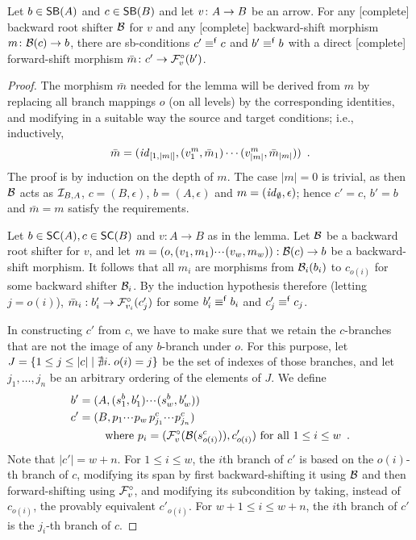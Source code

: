 \begin{lemma}
Let $b\in \SB A$ and $c\in \SB B$ and let $v\colon A\rightarrow B$ be an arrow. For any [complete] backward root shifter $\mathcal{B}$ for $v$ and any [complete] backward-shift morphism $m\colon \mathcal{B}(c)\rightarrow b$, there are sb-conditions  $c'\equiv^{\mathsf f} c$ and $b'\equiv^{\mathsf f} b$ with a direct [complete] forward-shift morphism $\bar m\colon c' \rightarrow \mathcal{F}^\circ_{v}(b')$.
\end{lemma}
%
\begin{proof}
The morphism $\bar m$ needed for the lemma will be derived from $m$ by replacing all branch mappings $o$ (on all levels) by the corresponding identities, and modifying in a suitable way the source and target conditions; i.e., inductively,
\[ \bar m=(\mathit{id}_{[1,|m|]},(v^m_1,\bar m_1)\cdots (v^m_{|m|},\bar m_{|m|})) \enspace. \]
The proof is by induction on the depth of $m$. The case $|m|=0$ is trivial, as then $\mathcal{B}$ acts as $\mathcal{I}_{B,A}$,  $c=(B,\epsilon)$, $b=(A,\epsilon)$ and $m=(\mathit{id}_\emptyset,\epsilon)$; hence  $c'=c$, $b'=b$ and $\bar m=m$ satisfy the requirements.

\smallskip
Let $b\in \SC A,c\in \SC B$ and $v:A\to B$ as in the lemma. Let $\mathcal{B}$ be a backward root shifter for $v$, and let $m=(o,(v_1,m_1){\cdotp\mkern-2mu\cdotp\mkern-2mu\cdotp\mkern1mu}(v_w,m_w)):  \mathcal{B}(c) \rightarrow b$ be a backward-shift morphism. It follows that all $m_i$ are morphisms from $\mathcal{B}_i(b_i)$ to $c_{o(i)}$ for some backward shifter $\mathcal{B}_i$. By the induction hypothesis therefore (letting $j=o(i)$), $\bar m_i: b_i' \rightarrow \mathcal{F}^\circ_{v_i}(c_j')$ for some $b'_i\equiv^{\mathsf f} b_i$ and $c_j'\equiv^{\mathsf f} c_j$.

\smallskip
In constructing $c'$ from $c$, we have to make sure that we retain the $c$-branches that are not the image of any $b$-branch under $o$. For this purpose, let $J=\{{1\leq j\leq |c|\mid \nexists i.\; o(i)=j}\}$ be the set of indexes of those branches, and let $j_1,\ldots,j_n$ be an arbitrary ordering of the elements of $J$. We define 
\begin{align*}
b'=\;&(A,(s^b_1,b'_1){\cdotp\mkern-2mu\cdotp\mkern-2mu\cdotp\mkern1mu} (s^b_w,b'_w)) \\
c'=\;&(B,p_1{\cdotp\mkern-2mu\cdotp\mkern-2mu\cdotp\mkern1mu} p_w\,p^c_{j_1}{\cdotp\mkern-2mu\cdotp\mkern-2mu\cdotp\mkern1mu} p^c_{j_n}) \\
   & \quad\text{where } p_i = (\mathcal{F}^\circ_{v}(\mathcal{B}(s^c_{o(i)})),c'_{o(i)}) \text{ for all $1\leq i\leq w$}\enspace.
\end{align*}
%
Note that $|c'|=w+n$. For $1\leq i\leq w$, the $i$th branch of $c'$ is based on the $o(i)$-th branch of $c$, modifying its span by first backward-shifting it using $\mathcal{B}$ and then forward-shifting using $\mathcal{F}^\circ_{v}$, and modifying its subcondition by taking, instead of $c_{o(i)}$, the provably equivalent $c'_{o(i)}$. For $w+1\leq i\leq w+n$, the $i$th branch of $c'$ is the $j_i$-th branch of $c$.


\end{proof}
